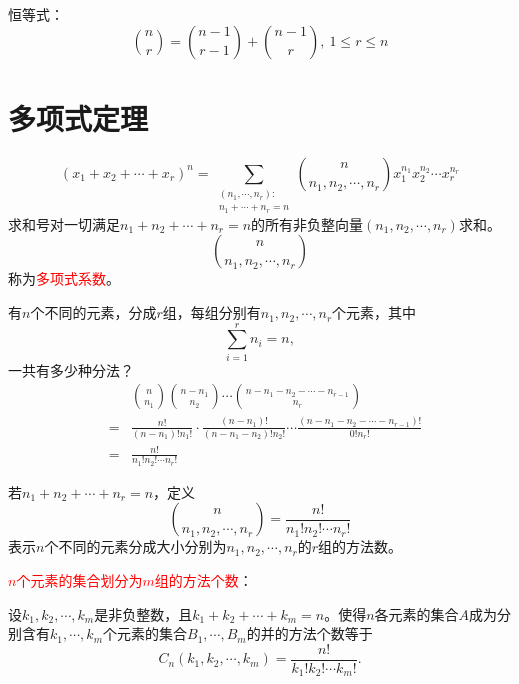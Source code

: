\documentclass[12pt,a4paper]{article}
\begin{document}
恒等式：
\begin{equation}
\binom{n}{r} = \binom{n-1}{r-1} +\binom{n-1}{r}, ~1 \leqslant r \leqslant n
\end{equation}





\section{多项式定理}
\begin{equation}
(x_1 +x_2 +\cdots +x_r)^n = \sum_{\substack{(n_1,\cdots,n_r): \\n_1+\cdots+n_r=n} } \binom{n}{n_1, n_2, \cdots, n_r}  x_1^{n_1} x_2^{n_2}\cdots x_r^{n_r}
\end{equation}
求和号对一切满足$n_1 +n_2 +\cdots +n_r = n$的所有非负整向量$(n_1, n_2, \cdots, n_r)$求和。
\begin{equation}
\binom{n}{n_1, n_2, \cdots, n_r} 
\end{equation}
称为\textcolor{red}{多项式系数}。


有$n$个不同的元素，分成$r$组，每组分别有$n_1, n_2, \cdots, n_r$个元素，其中
\begin{equation}
\sum_{i=1}^{r} n_i = n, 
\end{equation}
一共有多少种分法？
\begin{eqnarray}
\nonumber && \binom{n}{n_1} \binom{n -n_1}{n_2} \cdots \binom{n-n_1-n_2-\cdots -n_{r-1}}{n_r} \\
\nonumber &=& \frac{n!}{(n-n_1)!n_1!}\cdot \frac{(n-n_1)!}{(n-n_1-n_2)!n_2!}\cdots \frac{(n-n_1-n_2-\cdots -n_{r-1})!}{0!n_r!} \\
&=& \frac{n!}{n_1! n_2!\cdots n_r!}
\end{eqnarray}

若$n_1+n_2+\cdots+n_r = n$，定义
\begin{equation}
\binom{n}{n_1, n_2, \cdots, n_r} = \frac{n!}{n_1! n_2!\cdots n_r!}
\end{equation}
表示$n$个不同的元素分成大小分别为$n_1, n_2, \cdots, n_r$的$r$组的方法数。

\textcolor{red}{$n$个元素的集合划分为$m$组的方法个数}：

设$k_1, k_2, \cdots, k_m$是非负整数，且$k_1 +k_2+\cdots +k_m = n$。使得$n$各元素的集合$A$成为分别含有$k_1, \cdots, k_m$个元素的集合$B_1, \cdots, B_m$的并的方法个数等于
\begin{equation}
C_n(k_1, k_2, \cdots, k_m) = \frac{n!}{k_1!k_2!\cdots k_m!} .
\end{equation}
\end{document}
